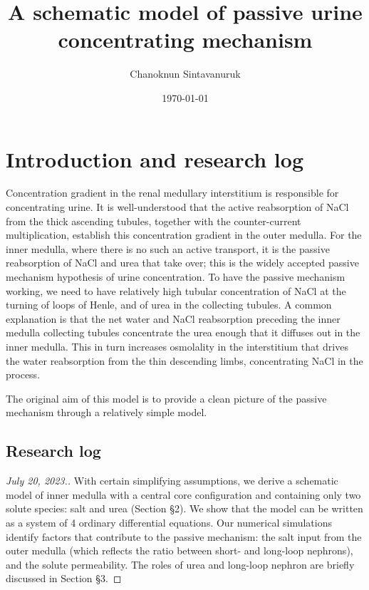 \documentclass{article}
\title{A schematic model of passive urine concentrating mechanism}
\author[1]{Chanoknun Sintavanuruk}
\date{\today}
\numberwithin{equation}{section} %
\begin{document}
\sloppy %
\maketitle

\section{Introduction and research log}

Concentration gradient in the renal medullary interstitium is responsible for concentrating urine.
It is well-understood that the active reabsorption of NaCl from the thick ascending tubules, together with the counter-current multiplication, establish this concentration gradient in the outer medulla.
For the inner medulla, where there is no such an active transport, it is the passive reabsorption of NaCl and urea that take over; this is the widely accepted passive mechanism hypothesis of urine concentration.
To have the passive mechanism working, we need to have relatively high tubular concentration of NaCl at the turning of loops of Henle, and of urea in the collecting tubules.
A common explanation is that the net water and NaCl reabsorption preceding the inner medulla collecting tubules concentrate the urea enough that it diffuses out in the inner medulla.
This in turn increases osmolality in the interstitium that drives the water reabsorption from the thin descending limbs, concentrating NaCl in the process.

The original aim of this model is to provide a clean picture of the passive mechanism through a relatively simple model.

\subsection{Research log}

\begin{proof}[July 20, 2023.]
    With certain simplifying assumptions, we derive a schematic model of inner medulla with a central core configuration and containing only two solute species: salt and urea (Section \S2).
    We show that the model can be written as a system of 4 ordinary differential equations.
    Our numerical simulations identify factors that contribute to the passive mechanism: the salt input from the outer medulla (which reflects the ratio between short- and long-loop nephrons), and the solute permeability.
    The roles of urea and long-loop nephron are briefly discussed in Section \S3.
\end{proof}
\end{document}
